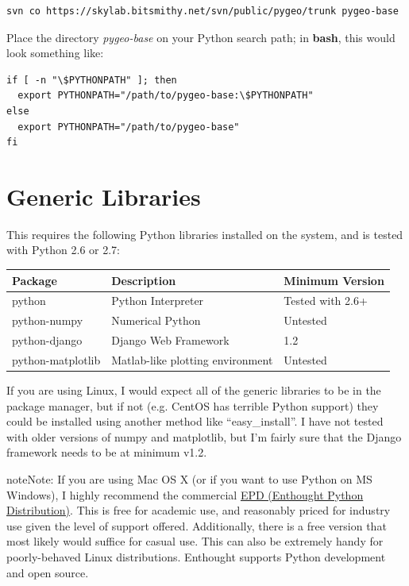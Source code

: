 \documentclass[letterpaper,10pt,english]{sphinxmanual}
\begin{document}
\begin{Verbatim}[commandchars=\\\{\}]
svn co https://skylab.bitsmithy.net/svn/public/pygeo/trunk pygeo-base
\end{Verbatim}

Place the directory \emph{pygeo-base} on your Python search path; in \textbf{bash}, this would look something like:

\begin{Verbatim}[commandchars=\\\{\}]
if [ -n "\$PYTHONPATH" ]; then
  export PYTHONPATH="/path/to/pygeo-base:\$PYTHONPATH"
else
  export PYTHONPATH="/path/to/pygeo-base"
fi
\end{Verbatim}


\section{Generic Libraries}
\label{installation:generic-libraries}
This requires the following Python libraries installed on the system, and is tested with Python 2.6 or 2.7:

\begin{tabulary}{\linewidth}{|L|L|L|}
\hline
\textbf{
Package
} & \textbf{
Description
} & \textbf{
Minimum Version
}\\\hline

python
 & 
Python Interpreter
 & 
Tested with 2.6+
\\\hline

python-numpy
 & 
Numerical Python
 & 
Untested
\\\hline

python-django
 & 
Django Web Framework
 & 
1.2
\\\hline

python-matplotlib
 & 
Matlab-like plotting environment
 & 
Untested
\\\hline
\end{tabulary}


If you are using Linux, I would expect all of the generic libraries to be in the package manager, but if not (e.g. CentOS has terrible Python support) they could be installed using another method like ``easy\_install''.  I have not tested with older versions of numpy and matplotlib, but I'm fairly sure that the Django framework needs to be at minimum v1.2.

\begin{notice}{note}{Note:}
If you are using Mac OS X (or if you want to use Python on MS Windows), I highly recommend the commercial \href{http://www.enthought.com/products/epd.php}{EPD (Enthought Python Distribution)}.  This is free for academic use, and reasonably priced for industry use given the level of support offered.  Additionally, there is a free version that most likely would suffice for casual use.  This can also be extremely handy for poorly-behaved Linux distributions.  Enthought supports Python development and open source.
\end{notice}
\end{document}
